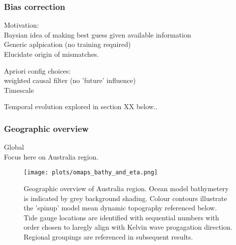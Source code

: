\subsubsection{Bias correction}
Motivation:\\
Baysian idea of making best guess given available information\\
Generic aplpication (no training required)\\
Elucidate origin of mismatches.


Apriori config choices:\\
weighted causal filter (no 'future' influence)\\
Timescale 
 

Temporal evolution explored in section XX below..
  



\subsubsection{Geographic overview}

Global\\
Focus here on Australia region.


\begin{figure}[H]
    \centering
    \texttt{[image: plots/omaps\_bathy\_and\_eta.png]}
    \caption{Geographic overview of Australia region.  Ocean model bathymetery is indicated by grey background shading.  Colour contours illustrate the 'spinup' model mean dynamic topography referenced below.  Tide gauge locations are identified with sequential numbers with order chosen to laregly align with Kelvin wave progagation direction. Regional groupings are referenced in subsequent results.}
    \label{fig:map_locations}
\end{figure}  


